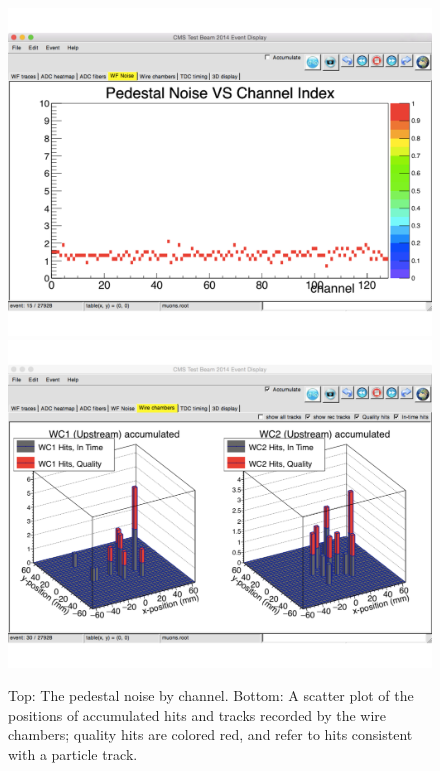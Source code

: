 \begin{figure}[h]\centering
\includegraphics[width=0.8\linewidth]{figures/CMS/Upgrade/PedestalNoise.pdf}\\
\vspace{-1cm}
\includegraphics[width=0.8\linewidth]{figures/CMS/Upgrade/WireChambers.pdf}
\caption{Top: The pedestal noise by channel. Bottom: A scatter plot of the positions of accumulated hits and tracks recorded by the wire chambers; quality hits are colored red, and refer to hits consistent with a particle track.}
\label{fig:NoiseAndWires}
\end{figure}
